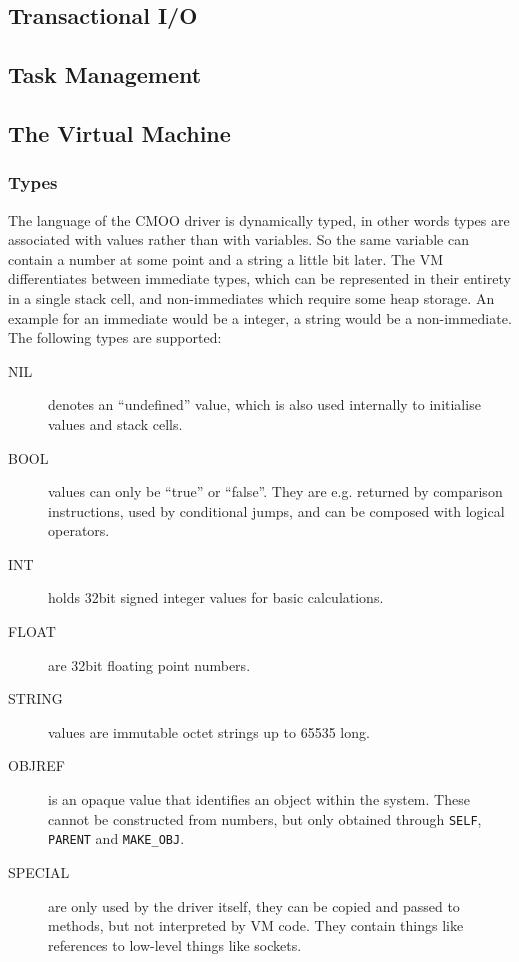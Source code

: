 \documentclass[12pt,a4paper]{article}
\begin{document}
\subsection{Transactional I/O}\label{sec:transactional_io}

\subsection{Task Management}\label{sec:task_mgmt}

\subsection{The Virtual Machine}\label{sec:virtual_machine}

\subsubsection{Types}\label{sec:types}

The language of the CMOO driver is dynamically typed, in other words types are associated with values rather than with variables. So the same variable can contain a number at some point and a string a little bit later. The VM differentiates between immediate types, which can be represented in their entirety in a single stack cell, and non-immediates which require some heap storage. An example for an immediate would be a integer, a string would be a non-immediate. The following types are supported:

\begin{description}
\item[NIL] denotes an ``undefined'' value, which is also used internally to initialise values and stack cells.  
\item[BOOL] values can only be ``true'' or ``false''. They are e.g. returned by comparison instructions, used by conditional jumps, and can be composed with logical operators.
\item[INT] holds 32bit signed integer values for basic calculations.
\item[FLOAT] are 32bit floating point numbers.
\item[STRING] values are immutable octet strings up to 65535 long.  
\item[OBJREF] is an opaque value that identifies an object within the system. These cannot be constructed from numbers, but only obtained through \verb|SELF|, \verb|PARENT| and \verb|MAKE_OBJ|. 
\item[SPECIAL] are only used by the driver itself, they can be copied and passed to methods, but not interpreted by VM code. They contain things like references to low-level things like sockets.
\end{description}
\end{document}
